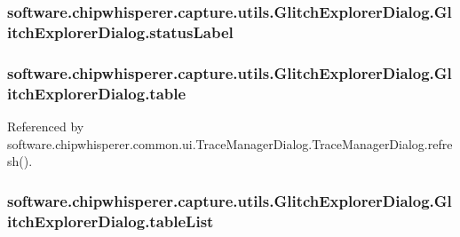 \subsubsection[{status\+Label}]{\setlength{\rightskip}{0pt plus 5cm}software.\+chipwhisperer.\+capture.\+utils.\+Glitch\+Explorer\+Dialog.\+Glitch\+Explorer\+Dialog.\+status\+Label}\label{classsoftware_1_1chipwhisperer_1_1capture_1_1utils_1_1GlitchExplorerDialog_1_1GlitchExplorerDialog_a184d326ac72cca41fd798a9a830841a2}
\hypertarget{classsoftware_1_1chipwhisperer_1_1capture_1_1utils_1_1GlitchExplorerDialog_1_1GlitchExplorerDialog_afe68b17f32606cea4962ff0daaf9fa1f}{}
\subsubsection[{table}]{\setlength{\rightskip}{0pt plus 5cm}software.\+chipwhisperer.\+capture.\+utils.\+Glitch\+Explorer\+Dialog.\+Glitch\+Explorer\+Dialog.\+table}\label{classsoftware_1_1chipwhisperer_1_1capture_1_1utils_1_1GlitchExplorerDialog_1_1GlitchExplorerDialog_afe68b17f32606cea4962ff0daaf9fa1f}


Referenced by software.\+chipwhisperer.\+common.\+ui.\+Trace\+Manager\+Dialog.\+Trace\+Manager\+Dialog.\+refresh().

\hypertarget{classsoftware_1_1chipwhisperer_1_1capture_1_1utils_1_1GlitchExplorerDialog_1_1GlitchExplorerDialog_acaa9b92ab48e0d9ac3667d6fd4853bcd}{}
\subsubsection[{table\+List}]{\setlength{\rightskip}{0pt plus 5cm}software.\+chipwhisperer.\+capture.\+utils.\+Glitch\+Explorer\+Dialog.\+Glitch\+Explorer\+Dialog.\+table\+List}\label{classsoftware_1_1chipwhisperer_1_1capture_1_1utils_1_1GlitchExplorerDialog_1_1GlitchExplorerDialog_acaa9b92ab48e0d9ac3667d6fd4853bcd}


